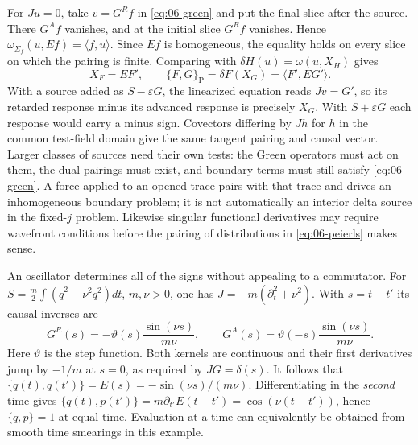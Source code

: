 For $Ju=0$, take $v=G^R f$ in \eqref{eq:06-green} and put the final slice
after the source. There $G^A f$ vanishes, and at the initial slice $G^R f$
vanishes. Hence $\omega_{\Sigma_f}(u,Ef)=\langle f,u\rangle$. Since $Ef$
is homogeneous, the equality holds on every slice on which the pairing is
finite. Comparing with $\delta H(u)=\omega(u,X_H)$ gives
\begin{equation}
 X_F=E F',\qquad \{F,G\}_{\mathrm P}=\delta F(X_G)
                 =\langle F',E G'\rangle.
 \label{eq:06-peierls}
\end{equation}
With a source added as $S-\varepsilon G$, the linearized equation reads
$Jv=G'$, so its retarded response minus its advanced response is precisely
$X_G$. With $S+\varepsilon G$ each response would carry a minus sign.
Covectors differing by $Jh$ for $h$ in the common test-field domain give
the same tangent pairing and causal vector. Larger classes of sources need their own tests:
the Green operators must act on them, the dual pairings must exist, and
boundary terms must still satisfy \eqref{eq:06-green}. A force applied to an
opened trace pairs with that trace and drives an inhomogeneous boundary
problem; it is not automatically an interior delta source in the fixed-$j$
problem. Likewise singular functional derivatives may require wavefront
conditions before the pairing of distributions in \eqref{eq:06-peierls}
makes sense.

An oscillator determines all of the signs without appealing to a commutator.
For $S=\tfrac m2\int(\dot q^2-\nu^2q^2)dt$, $m,\nu>0$, one has
$J=-m(\partial_t^2+\nu^2)$. With $s=t-t'$ its causal inverses are
\[
 G^R(s)=-\vartheta(s)\frac{\sin(\nu s)}{m\nu},\qquad
 G^A(s)= \vartheta(-s)\frac{\sin(\nu s)}{m\nu}.
\]
Here $\vartheta$ is the step function. Both kernels are continuous and their
first derivatives jump by $-1/m$ at $s=0$, as required by $JG=\delta(s)$.
It follows that $\{q(t),q(t')\}=E(s)=-\sin(\nu s)/(m\nu)$. Differentiating
in the \emph{second} time gives $\{q(t),p(t')\}=m\partial_{t'}E(t-t')
=\cos(\nu(t-t'))$, hence $\{q,p\}=1$ at equal time. Evaluation at a time
can equivalently be obtained from smooth time smearings in this example.

